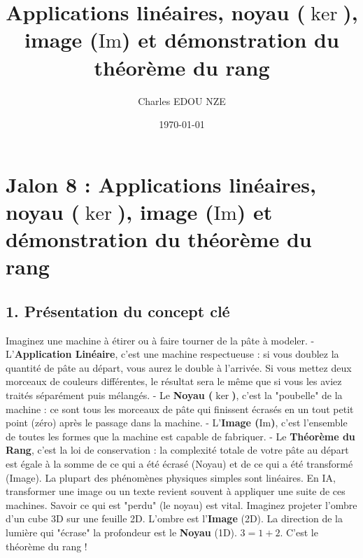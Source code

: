 \documentclass{report}
\title{Applications lin\'eaires, noyau ($\ker$), image ($\text{Im}$) et d\'emonstration du th\'eor\`eme du rang}
\author{Charles EDOU NZE}
\date{\today}
\begin{document}
\maketitle
\tableofcontents
\newpage

\chapter*{Jalon 8 : Applications linéaires, noyau ($\ker$), image ($\text{Im}$) et démonstration du théorème du rang}

\section*{1. Présentation du concept clé}

\begin{figure}[h]
\centering
{}
\end{figure}


 Imaginez une machine à étirer ou à faire tourner de la pâte à modeler.
  - L'\textbf{Application Linéaire}, c'est une machine respectueuse : si vous doublez la quantité de pâte au départ, vous aurez le double à l'arrivée. Si vous mettez deux morceaux de couleurs différentes, le résultat sera le même que si vous les aviez traités séparément puis mélangés.
  - Le \textbf{Noyau ($\ker$)}, c'est la "poubelle" de la machine : ce sont tous les morceaux de pâte qui finissent écrasés en un tout petit point (zéro) après le passage dans la machine.
  - L'\textbf{Image ($\text{Im}$)}, c'est l'ensemble de toutes les formes que la machine est capable de fabriquer.
  - Le \textbf{Théorème du Rang}, c'est la loi de conservation : la complexité totale de votre pâte au départ est égale à la somme de ce qui a été écrasé (Noyau) et de ce qui a été transformé (Image).
 La plupart des phénomènes physiques simples sont linéaires. En IA, transformer une image ou un texte revient souvent à appliquer une suite de ces machines. Savoir ce qui est "perdu" (le noyau) est vital.
 Imaginez projeter l'ombre d'un cube 3D sur une feuille 2D. L'ombre est l'\textbf{Image} (2D). La direction de la lumière qui "écrase" la profondeur est le \textbf{Noyau} (1D). $3 = 1 + 2$. C'est le théorème du rang !
\end{document}

